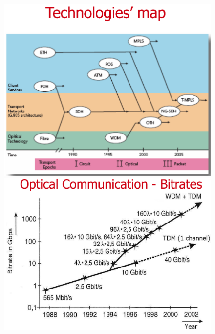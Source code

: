 \documentclass[8pt]{extarticle}
\begin{document}
\begin{figure}[H]
    \centering
    \begin{minipage}[c]{\linewidth}
        \begin{minipage}[l]{0.43\linewidth}
            \includegraphics[width=\linewidth]{images/FO19.png}
        \end{minipage}
        \hspace{0.04\linewidth}
        \begin{minipage}[l]{0.53\linewidth}
            \includegraphics[width=\linewidth]{images/FO20.png}
        \end{minipage}
    \end{minipage}
\end{figure}
\end{document}

